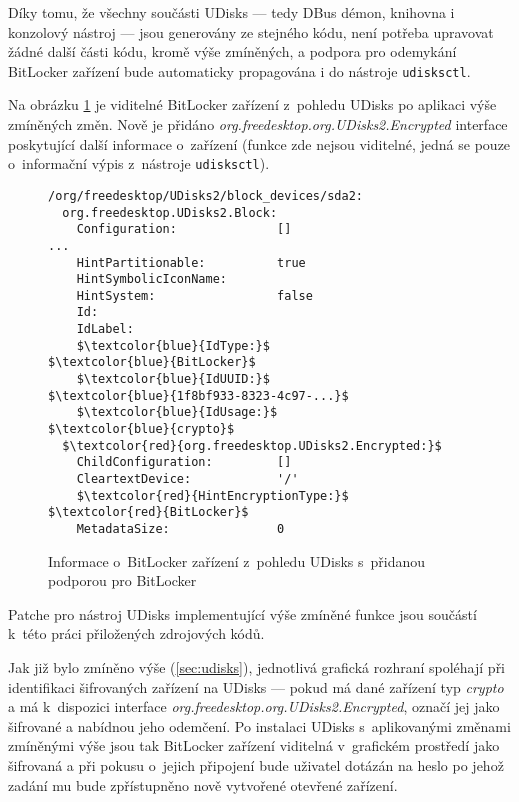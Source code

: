 Díky tomu, že všechny součásti UDisks --- tedy DBus démon, knihovna i konzolový nástroj --- jsou generovány ze stejného kódu, není potřeba upravovat žádné další části kódu, kromě výše zmíněných, a podpora pro odemykání BitLocker zařízení bude automaticky propagována i do nástroje \texttt{udisksctl}.

Na obrázku \ref{fig:udisks-bitlocker-with-support} je viditelné BitLocker zařízení z~pohledu UDisks po aplikaci výše zmíněných změn. Nově je přidáno \emph{org.freedesktop.org.UDisks2.Encrypted} interface po\-sky\-tu\-jí\-cí další informace o~zařízení (funkce zde nejsou viditelné, jedná se pouze o~informační výpis z~nástroje \texttt{udisksctl}).

\begin{figure}[h]
		\centering
		\captionsetup{width=0.65\linewidth}
\begin{center}
\centering
\begin{lstlisting}[frame=none, escapechar=$, basicstyle=\ttfamily\small, columns=fullflexible, keepspaces=true, xleftmargin=.2\textwidth, xrightmargin=.2\textwidth]
/org/freedesktop/UDisks2/block_devices/sda2:
  org.freedesktop.UDisks2.Block:
    Configuration:              []
...
    HintPartitionable:          true
    HintSymbolicIconName:
    HintSystem:                 false
    Id:
    IdLabel:
    $\textcolor{blue}{IdType:}$                     $\textcolor{blue}{BitLocker}$
    $\textcolor{blue}{IdUUID:}$                     $\textcolor{blue}{1f8bf933-8323-4c97-...}$
    $\textcolor{blue}{IdUsage:}$                    $\textcolor{blue}{crypto}$
  $\textcolor{red}{org.freedesktop.UDisks2.Encrypted:}$
    ChildConfiguration:         []
    CleartextDevice:            '/'
    $\textcolor{red}{HintEncryptionType:}$          $\textcolor{red}{BitLocker}$
    MetadataSize:               0

\end{lstlisting}
\end{center}
		\caption{Informace o~BitLocker zařízení z~pohledu UDisks s~přidanou podporou pro BitLocker}
		\label{fig:udisks-bitlocker-with-support}
\end{figure}

Patche pro nástroj UDisks implementující výše zmíněné funkce jsou součástí k~této práci přiložených zdrojových kódů.


Jak již bylo zmíněno výše (\ref{sec:udisks}), jednotlivá grafická rozhraní spoléhají při identifikaci šifrovaných zařízení na UDisks --- pokud má dané zařízení typ \emph{crypto} a má k~dispozici interface \emph{org.freedesktop.org.UDisks2.Encrypted}, označí jej jako šifrované a nabídnou jeho odemčení. Po instalaci UDisks s~aplikovanými změnami zmíněnými výše jsou tak BitLocker zařízení viditelná v~grafickém prostředí jako šifrovaná a při pokusu o~jejich připojení bude uživatel dotázán na heslo po jehož zadání mu bude zpřístupněno nově vytvořené otevřené zařízení.

